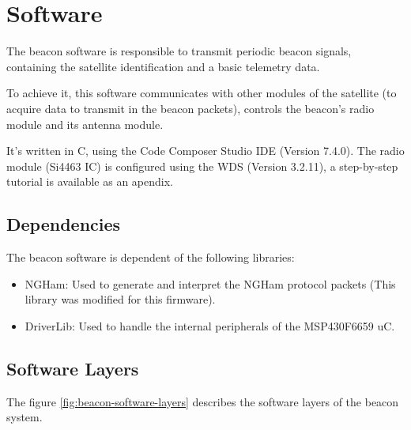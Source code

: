 %
%
%
%
%

%
%
%
%
%
%

\chapter{Software} \label{ch:software}

The beacon software is responsible to transmit periodic beacon signals, containing the satellite identification and a basic telemetry data.

To achieve it, this software communicates with other modules of the satellite (to acquire data to transmit in the beacon packets), controls the beacon's radio module and its antenna module.

It's written in C, using the Code Composer Studio IDE (Version 7.4.0). The radio module (Si4463 IC) is configured using the WDS (Version 3.2.11), a step-by-step tutorial is available as an apendix.

\section{Dependencies}

The beacon software is dependent of the following libraries:

\begin{itemize}
    \item NGHam: Used to generate and interpret the NGHam protocol packets (This library was modified for this firmware).
    \item DriverLib: Used to handle the internal peripherals of the MSP430F6659 uC.
\end{itemize}


\section{Software Layers}

The figure \ref{fig:beacon-software-layers} describes the software layers of the beacon system.

